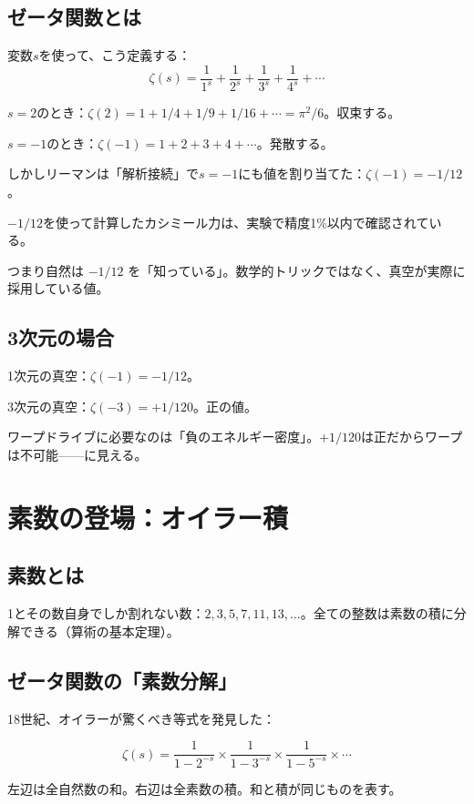 \documentclass[12pt,a4paper]{article}
\begin{document}
\subsection{ゼータ関数とは}

変数$s$を使って、こう定義する：
$$\zeta(s) = \frac{1}{1^s} + \frac{1}{2^s} + \frac{1}{3^s} + \frac{1}{4^s} + \cdots$$

$s=2$のとき：$\zeta(2) = 1 + 1/4 + 1/9 + 1/16 + \cdots = \pi^2/6$。収束する。

$s=-1$のとき：$\zeta(-1) = 1 + 2 + 3 + 4 + \cdots$。発散する。

しかしリーマンは「解析接続」で$s=-1$にも値を割り当てた：$\zeta(-1) = -1/12$。

\begin{storybox}[これはインチキか？]
$-1/12$を使って計算したカシミール力は、実験で精度1\%以内で確認されている。

つまり自然は $-1/12$ を「知っている」。数学的トリックではなく、真空が実際に採用している値。
\end{storybox}

\subsection{3次元の場合}

1次元の真空：$\zeta(-1) = -1/12$。

3次元の真空：$\zeta(-3) = +1/120$。正の値。

ワープドライブに必要なのは「負のエネルギー密度」。$+1/120$は正だからワープは不可能——に見える。

\section{素数の登場：オイラー積}

\subsection{素数とは}

1とその数自身でしか割れない数：$2, 3, 5, 7, 11, 13, \ldots$。全ての整数は素数の積に分解できる（算術の基本定理）。

\subsection{ゼータ関数の「素数分解」}

18世紀、オイラーが驚くべき等式を発見した：

\begin{mathbox}[オイラー積]
$$\zeta(s) = \frac{1}{1-2^{-s}} \times \frac{1}{1-3^{-s}} \times \frac{1}{1-5^{-s}} \times \cdots$$

左辺は全自然数の和。右辺は全素数の積。和と積が同じものを表す。
\end{mathbox}
\end{document}
